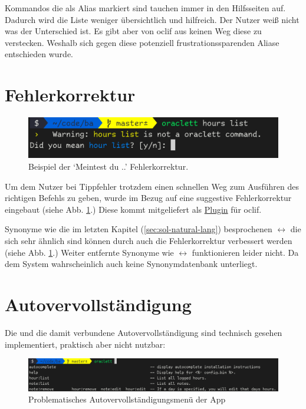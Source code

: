 \documentclass[oneside,bibliography=totocnumbered,BCOR=5mm]{scrbook}
\begin{document}
Kommandos die als Alias markiert sind tauchen immer in den Hilfsseiten auf.
Dadurch wird die Liste weniger übersichtlich und hilfreich. Der Nutzer weiß
nicht was der Unterschied ist. Es gibt aber von oclif aus keinen Weg diese zu
verstecken. Weshalb sich gegen diese potenziell frustrationssparenden Aliase
entschieden wurde.

\section{Fehlerkorrektur}

\begin{figure}[H]
  \centering
  \includegraphics[scale=0.6]{did-you-mean.png}
  \caption{Beispiel der `Meintest du ..' Fehlerkorrektur.}
  \label{fig:did-you-mean}
\end{figure}

Um dem Nutzer bei Tippfehler trotzdem einen schnellen Weg zum
Ausführen des richtigen Befehls zu geben, wurde im Bezug auf
 eine suggestive Fehlerkorrektur eingebaut (siehe
Abb. \ref{fig:did-you-mean}.) Diese kommt mitgeliefert als
\href{https://www.npmjs.com/package/@oclif/plugin-not-found}{Plugin} für oclif.

\bigskip

Synonyme wie die im letzten Kapitel (\ref{sec:sol-natural-lang}) besprochenen
 $\leftrightarrow$  die sich sehr ähnlich
sind können durch auch die Fehlerkorrektur verbessert werden (siehe Abb.
\ref{fig:did-you-mean}.) Weiter entfernte Synonyme wie 
$\leftrightarrow$  funktionieren leider nicht. Da dem System
wahrscheinlich auch keine Synonymdatenbank unterliegt.

\section{Autovervollständigung}
\label{sec:impl-autocomplete}

Die  und die damit verbundene Autovervollständigung sind
technisch gesehen implementiert, praktisch aber nicht nutzbar:

\begin{figure}[H]
  \centering
  \includegraphics[scale=0.42]{apps-autocomplete.png}
  \caption{Problematisches Autovervollständigungsmenü der App}
  \label{fig:apps-autocomplete}
\end{figure}
\end{document}
